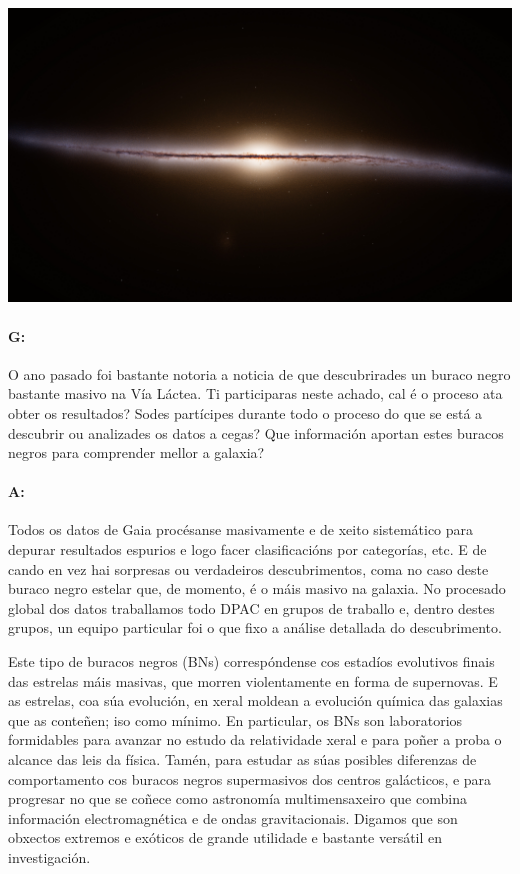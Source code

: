 \begin{refsection}
\begin{multicols}{2}
\begin{center}
    \includegraphics[width=1\linewidth]{revistas/002/imaxes/vialactea.jpg}
\end{center}

\paragraph{G:} O ano pasado foi bastante notoria a noticia de que descubrirades un
buraco negro bastante masivo na Vía Láctea. Ti participaras neste achado, cal é
o proceso ata obter os resultados? Sodes partícipes durante todo o proceso do
que se está a descubrir ou analizades os datos a cegas? Que información aportan
estes buracos negros para comprender mellor a galaxia?

\paragraph{A:} Todos os datos de Gaia procésanse masivamente e de xeito
sistemático para depurar resultados espurios e logo facer clasificacións por
categorías, etc. E de cando en vez hai sorpresas ou verdadeiros descubrimentos,
coma no caso deste buraco negro estelar que, de momento, é o máis masivo na
galaxia. No procesado global dos datos traballamos todo DPAC en grupos de
traballo e, dentro destes grupos, un equipo particular foi o que fixo a análise
detallada do descubrimento.

Este tipo de buracos negros (BNs) correspóndense cos estadíos evolutivos finais
das estrelas máis masivas, que morren violentamente en forma de supernovas. E
as estrelas, coa súa evolución, en xeral moldean a evolución química das
galaxias que as conteñen; iso como mínimo. En particular, os BNs son
laboratorios formidables para avanzar no estudo da relatividade xeral e para
poñer a proba o alcance das leis da física. Tamén, para estudar as súas
posibles diferenzas de comportamento cos buracos negros supermasivos dos
centros galácticos, e para progresar no que se coñece como astronomía
multimensaxeiro que combina información electromagnética e de ondas
gravitacionais. Digamos que son obxectos extremos e exóticos de grande
utilidade e bastante versátil en investigación.


\end{multicols}
\end{refsection}
